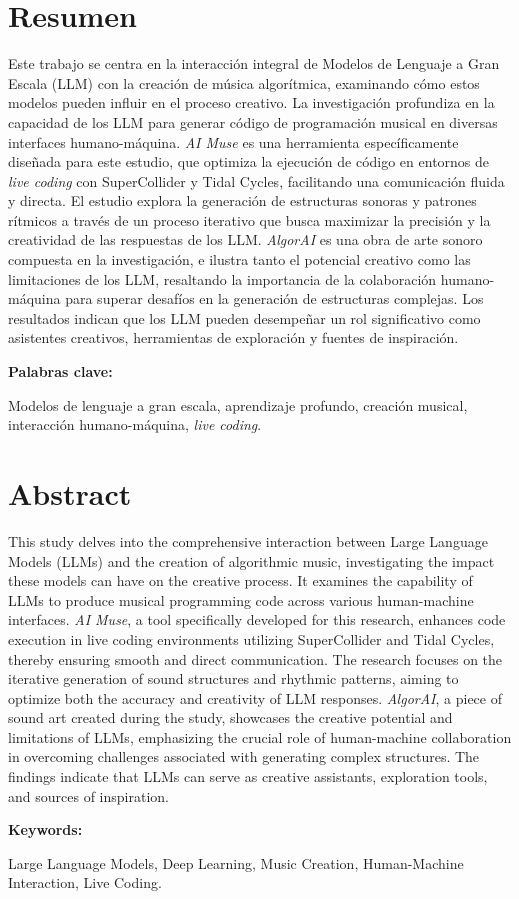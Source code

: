   \clearpage
  \chapter*{Resumen}

  Este trabajo se centra en la interacción integral de Modelos de Lenguaje a Gran Escala (LLM) con la creación de música algorítmica, examinando cómo estos modelos pueden influir en el proceso creativo. La investigación profundiza en la capacidad de los LLM para generar código de programación musical en diversas interfaces humano-máquina. \emph{AI Muse} es una herramienta específicamente diseñada para este estudio, que optimiza la ejecución de código en entornos de \emph{live coding} con SuperCollider y Tidal Cycles, facilitando una comunicación fluida y directa. El estudio explora la generación de estructuras sonoras y patrones rítmicos a través de un proceso iterativo que busca maximizar la precisión y la creatividad de las respuestas de los LLM. \emph{AlgorAI} es una obra de arte sonoro compuesta en la investigación, e ilustra tanto el potencial creativo como las limitaciones de los LLM, resaltando la importancia de la colaboración humano-máquina para superar desafíos en la generación de estructuras complejas. Los resultados indican que los LLM pueden desempeñar un rol significativo como asistentes creativos, herramientas de exploración y fuentes de inspiración.


  \vspace{1cm}
  \textbf{Palabras clave:} %

  Modelos de lenguaje a gran escala, aprendizaje profundo, creación musical, interacción humano-máquina, \emph{live coding}.


    \clearpage
    \chapter*{Abstract}
  
    This study delves into the comprehensive interaction between Large Language Models (LLMs) and the creation of algorithmic music, investigating the impact these models can have on the creative process. It examines the capability of LLMs to produce musical programming code across various human-machine interfaces. \emph{AI Muse}, a tool specifically developed for this research, enhances code execution in live coding environments utilizing SuperCollider and Tidal Cycles, thereby ensuring smooth and direct communication. The research focuses on the iterative generation of sound structures and rhythmic patterns, aiming to optimize both the accuracy and creativity of LLM responses. \emph{AlgorAI}, a piece of sound art created during the study, showcases the creative potential and limitations of LLMs, emphasizing the crucial role of human-machine collaboration in overcoming challenges associated with generating complex structures. The findings indicate that LLMs can serve as creative assistants, exploration tools, and sources of inspiration.
  
    \vspace{1cm}
    \textbf{Keywords:} %
    
    Large Language Models, Deep Learning, Music Creation, Human-Machine Interaction, Live Coding.
  